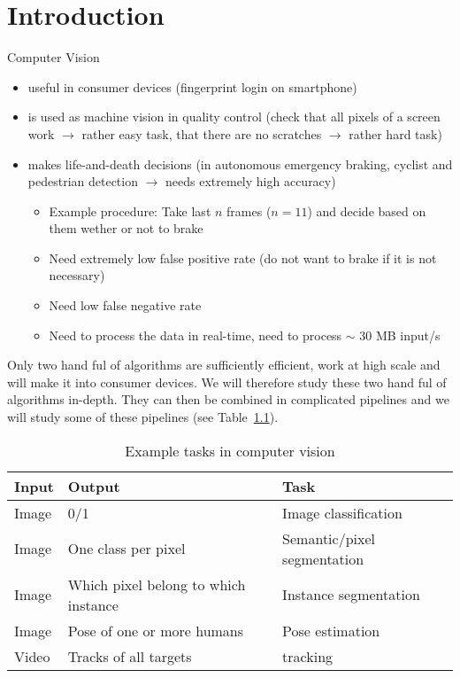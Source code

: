 \chapter{Introduction}

Computer Vision
\begin{itemize}
\item useful in consumer devices (\eg fingerprint login on smartphone)
\item is used as machine vision in quality control (\eg check that all
  pixels of a screen work $\rightarrow$ rather easy task, that there
  are no scratches $\rightarrow$ rather hard task)
\item makes life-and-death decisions (\eg in autonomous emergency
  braking, cyclist and pedestrian detection $\rightarrow$ needs
  extremely high accuracy)
  \begin{itemize}
  \item Example procedure: Take last $n$ frames (\eg $n = 11$) and
    decide based on them wether or not to brake
  \item Need extremely low false positive rate (do not want to brake
    if it is not necessary)
  \item Need low false negative rate
  \item Need to process the data in real-time, \ie need to process
    $\sim$ 30 MB input/s
  \end{itemize}
\end{itemize}
Only two hand ful of algorithms are sufficiently efficient, \ie work
at high scale and will make it into consumer devices. We will
therefore study these two hand ful of algorithms in-depth. They can
then be combined in complicated pipelines and we will study some of
these pipelines (see Table~\ref{tab:ex:tasks}).

\begin{table}[htpb]
  \centering
  \begin{tabular}{lll}
    \toprule
    Input & Output & Task \\
    \midrule
    Image & 0/1 & Image classification \\
    Image & One class per pixel & Semantic/pixel segmentation \\
    Image & Which pixel belong to which instance & Instance segmentation \\
    Image & Pose of one or more humans & Pose estimation \\
    Video & Tracks of all targets & tracking
  \end{tabular}
  \caption{Example tasks in computer vision}%
  \label{tab:ex:tasks}
\end{table}


